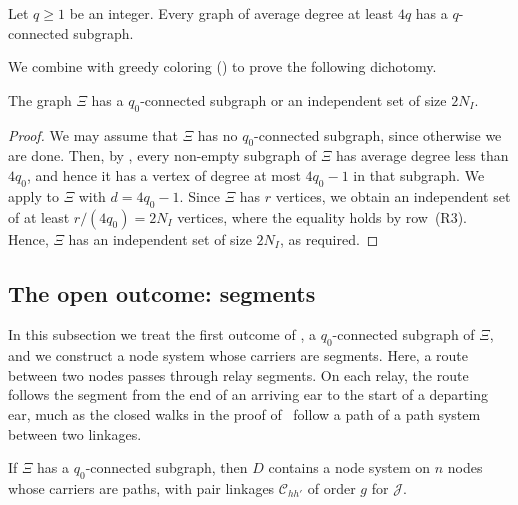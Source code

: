 \documentclass[fontsize=12pt,leading=14pt]{fullpaper}
\newcommand{\Ccal}{\mathcal{C}}
\newcommand{\Jcal}{\mathcal{J}}
\begin{document}
\begin{proposition}\label{prop:mader}
  Let $q\ge1$ be an integer.
  Every graph of average degree at least $4q$ has a $q$-connected subgraph.
\end{proposition}

We combine  with greedy coloring () to prove the following dichotomy.

\begin{lemma}\label{lem:prep-conn}
  The graph $\Xi$ has a $q_0$-connected subgraph or an independent set of size $2N_I$.
\end{lemma}

\begin{proof}
  We may assume that $\Xi$ has no $q_0$-connected subgraph, since otherwise we are done.
  Then, by , every non-empty subgraph of $\Xi$ has average degree less than $4q_0$, and hence it has a vertex of degree at most $4q_0-1$ in that subgraph.
  We apply  to $\Xi$ with $d=4q_0-1$.
  Since $\Xi$ has $r$ vertices, we obtain an independent set of at least $r/(4q_0)=2N_I$ vertices, where the equality holds by row~(R3).
  Hence, $\Xi$ has an independent set of size $2N_I$, as required.
\end{proof}

\subsection{The open outcome: segments}\label{sec:prep-open}

In this subsection we treat the first outcome of , a $q_0$-connected subgraph of $\Xi$, and we construct a node system whose carriers are segments.
Here, a route between two nodes passes through relay segments.
On each relay, the route follows the segment from the end of an arriving ear to the start of a departing ear, much as the closed walks in the proof of~\cite[Lemma~3.2]{MPRS22} follow a path of a path system between two linkages.

\begin{lemma}\label{lem:prep-open-system}
  If $\Xi$ has a $q_0$-connected subgraph, then $D$ contains a node system on $n$ nodes whose carriers are paths, with pair linkages $\Ccal_{hh'}$ of order $g$ for $\Jcal$.
\end{lemma}
\end{document}
